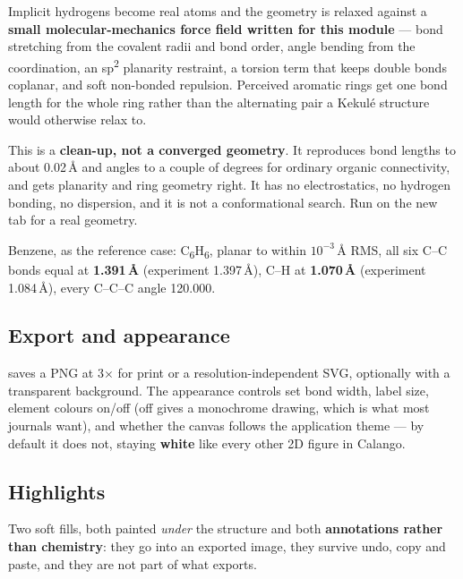 Implicit hydrogens become real atoms and the geometry is relaxed against a
\textbf{small molecular-mechanics force field written for this module} ---
bond stretching from the covalent radii and bond order, angle bending from
the coordination, an sp\textsuperscript{2} planarity restraint, a torsion
term that keeps double bonds coplanar, and soft non-bonded repulsion.
Perceived aromatic rings get one bond length for the whole ring rather than
the alternating pair a Kekul\'e structure would otherwise relax to.

\begin{calnote}[title={Accuracy}]
This is a \textbf{clean-up, not a converged geometry}. It reproduces bond
lengths to about 0.02\,\AA{} and angles to a couple of degrees for ordinary
organic connectivity, and gets planarity and ring geometry right. It has no
electrostatics, no hydrogen bonding, no dispersion, and it is not a
conformational search. Run \menusep{} on the new tab for a real geometry.
\end{calnote}

Benzene, as the reference case: C\textsubscript{6}H\textsubscript{6}, planar
to within $10^{-3}$\,\AA{} RMS, all six C--C bonds equal at
\textbf{1.391\,\AA} (experiment 1.397\,\AA), C--H at \textbf{1.070\,\AA}
(experiment 1.084\,\AA), every C--C--C angle 120.000\textdegree.

\subsection{Export and appearance}

 saves a PNG at 3$\times$ for print or a
resolution-independent SVG, optionally with a transparent background. The
appearance controls set bond width, label size, element colours on/off
(off gives a monochrome drawing, which is what most journals want), and
whether the canvas follows the application theme --- by default it does not,
staying \textbf{white} like every other 2D figure in Calango.

\subsection{Highlights}

Two soft fills, both painted \emph{under} the structure and both
\textbf{annotations rather than chemistry}: they go into an exported image,
they survive undo, copy and paste, and they are not part of what
 exports.

